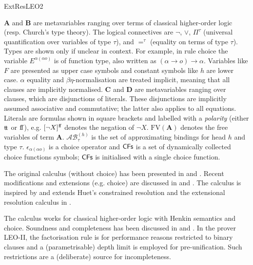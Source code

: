 \begin{entry}{ExtResLEO2}
 \begin{clarifications}
 $\mathbf{A}$ and $\mathbf{B}$ are metavariables ranging over terms of classical higher-order logic (resp. Church's type theory). The logical connectives are $\neg$, $\vee$, $\Pi^\tau$ (universal quantification over variables of type $\tau$), and $=^\tau$ (equality on terms of type $\tau$). Types are shown only if unclear in context. For example, in  rule choice the variable $E^{\alpha (\alpha o)}$ is of function type, also written as ${(\alpha \rightarrow o) \rightarrow \alpha}$. Variables like $F$ are presented as upper case symbols and constant symbols like $h$  are lower case. $\alpha$ equality and $\beta\eta$-normalisation are treated implicit, meaning that all clauses are implicitly normalised. $\mathbf{C}$ and $\mathbf{D}$ are metavariables ranging over clauses, which are disjunctions of literals. These disjunctions are implicitly assumed associative and commutative; the latter also applies to all equations. Literals are formulas shown in square brackets and labelled with a \emph{polarity} (either ${\mathrm{t}\!\mathrm{t}}$ or ${\mathrm{f}\!\mathrm{f}}$), e.g. $[\neg X]^{\mathrm{f}\!\mathrm{f}}$ denotes the negation of $\neg X$.  $\mathrm{FV}(\mathbf{A})$ denotes the free variables of term $\mathbf{A}$. $\mathcal{AB}^{(h)}_\tau$ is the set of approximating bindings for head $h$ and type $\tau$. $\epsilon_{\alpha (\alpha o)}$ is a choice operator and $\textsf{CFs}$ is a set of dynamically collected choice functions symbols; $\textsf{CFs}$ is initialised with a single choice function.
\end{clarifications}


 \begin{history}
The original calculus (without choice) has been presented in \cite{C5} and \cite{J5}. Recent modifications and extensions (e.g. choice) are discussed in  \cite{W47} and \cite{EasyChair:215}.
The calculus is inspired by and extends Huet's constrained resolution \cite{Huet:amott73,Huet:cracmfhol72} and the extensional resolution calculus in \cite{C2}.
 \end{history}

\begin{technicalities} 
The calculus works for classical higher-order logic with Henkin semantics and choice. Soundness and completeness has been discussed in  \cite{C5} and \cite{J5}. In the prover LEO-II, the factorisation rule is for performance reasons restricted to binary clauses and a (parametrisable) depth limit is employed for pre-unification. Such restrictions are a (deliberate) source for incompleteness.
 \end{technicalities}



\end{entry}
